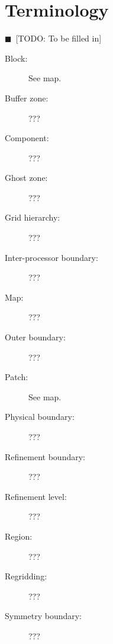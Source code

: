 \documentclass[oneside]{amsart}
\newcommand{\todo}[1]{{\color{blue}$\blacksquare$~\textsf{[TODO: #1]}}}
\begin{document}
\appendix
\section{Terminology}

\todo{To be filled in}
\begin{description}
\item[Block:] See map.
\item[Buffer zone:] ???
\item[Component:] ???
\item[Ghost zone:] ???
\item[Grid hierarchy:] ???
\item[Inter-processor boundary:] ???
\item[Map:] ???
\item[Outer boundary:] ???
\item[Patch:] See map.
\item[Physical boundary:] ???
\item[Refinement boundary:] ???
\item[Refinement level:] ???
\item[Region:] ???
\item[Regridding:] ???
\item[Symmetry boundary:] ???
\end{description}





\end{document}
